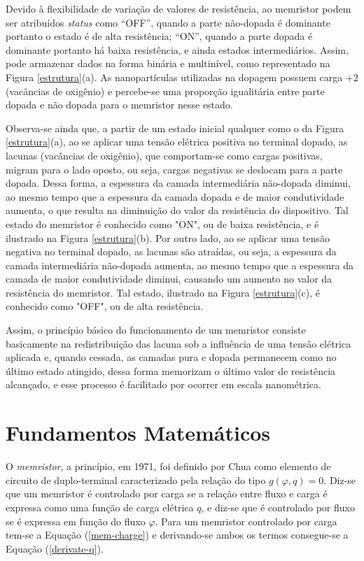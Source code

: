 \documentclass{ceel}
\begin{document}
\begin{multicols}{2}
Devido à flexibilidade de variação de valores de resistência, ao memristor podem ser atribuídos \emph{status} como “OFF”, quando a parte não-dopada é dominante portanto o estado é de alta resistência; “ON”, quando a parte dopada é dominante portanto há baixa resistência, e ainda estados intermediários. Assim, pode armazenar dados na forma binária e multinível, como representado na Figura \ref{estrutura}(a). As nanopartículas utilizadas na dopagem possuem carga $+2$ (vacâncias de oxigênio) e percebe-se uma proporção igualitária entre parte dopada e não dopada para o memristor nesse estado. 

Observa-se ainda que, a partir de um estado inicial qualquer como o da Figura \ref{estrutura}(a), ao se aplicar uma tensão elétrica positiva 
no terminal dopado, as lacunas (vacâncias de oxigênio), que comportam-se como cargas positivas, migram para o lado oposto, ou seja, cargas negativas se deslocam para a parte dopada.
 Dessa forma, a espessura da camada intermediária não-dopada diminui, ao mesmo tempo que a espessura da camada dopada e de maior condutividade aumenta, o que resulta na diminuição do valor da resistência do dispositivo. Tal estado do memristor é conhecido como "ON", ou de baixa resistência, e é ilustrado na Figura \ref{estrutura}(b). 
%
Por outro lado, ao se aplicar uma tensão negativa no terminal dopado, as lacunas são atraídas, ou seja, a espessura da camada intermediária não-dopada aumenta, ao mesmo tempo que a espessura 
da camada de maior condutividade diminui, causando um aumento no valor da resistência do memristor. Tal estado, ilustrado na Figura \ref{estrutura}(c), é conhecido como "OFF", ou de alta resistência. 

Assim, o princípio básico do funcionamento de um memristor consiste basicamente na redistribuição das lacuna sob a influência de uma tensão elétrica aplicada e, quando cessada, as 
camadas pura e dopada permanecem como no último estado atingido, dessa forma memorizam o último valor de resistência alcançado, e esse processo é facilitado por ocorrer em 
escala nanométrica. %

\section{Fundamentos Matemáticos}\label{analise-matematica}
O \emph{memristor}, a princípio, em 1971, foi definido por Chua \cite{artigo} como elemento de circuito de duplo-terminal caracterizado pela relação do tipo $g(\varphi, q)=0$. Diz-se que 
um memristor é controlado por carga se a relação entre fluxo e carga é expressa como uma função de carga elétrica $q$, e diz-se que é controlado por fluxo se é expressa em função do 
fluxo $\varphi$. Para um memristor controlado por carga tem-se a Equação (\ref{mem-charge}) e derivando-se ambos os termos consegue-se a Equação (\ref{derivate-q}).


\end{multicols}
\end{document}
